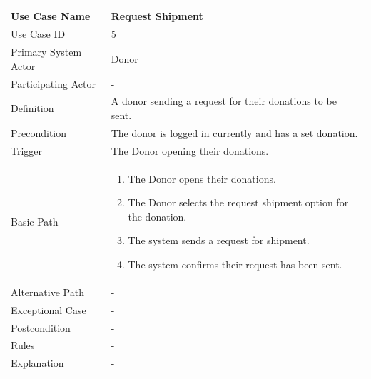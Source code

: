 \documentclass[a4paper,12pt]{report}
\begin{document}
		\begin{tabular}{|m{4cm}|m{11.5cm}|}
			\hline
				Use Case Name & Request Shipment\\
			\hline
				Use Case ID & 5\\
			\hline
				Primary System Actor & Donor\\
			\hline
				Participating Actor & -\\
			\hline
				Definition & A donor sending a request for their donations to be sent.\\
			\hline
				Precondition & The donor is logged in currently and has a set donation.\\
			\hline
				Trigger & The Donor opening their donations.\\
			\hline
				Basic Path & \begin{enumerate}
					\item The Donor opens their donations.
					\item The Donor selects the request shipment option for the donation.
					\item The system sends a request for shipment.
					\item The system confirms their request has been sent.
				\end{enumerate}		
				\\
			\hline
				Alternative Path & -\\
			\hline
				Exceptional Case & -\\
			\hline
				Postcondition & -\\
			\hline
				Rules & -\\
			\hline
				Explanation & -\\
			\hline
		\end{tabular}
\end{document}
